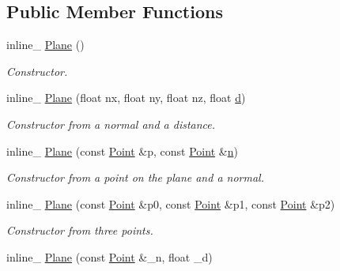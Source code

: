 \subsection*{Public Member Functions}
\begin{DoxyCompactItemize}
\item 
inline\+\_\+ \hyperlink{classPlane_abcc405319cab7568a33e6e1df69f144b}{Plane} ()\hypertarget{classPlane_abcc405319cab7568a33e6e1df69f144b}{}\label{classPlane_abcc405319cab7568a33e6e1df69f144b}

\begin{DoxyCompactList}\small\item\em Constructor. \end{DoxyCompactList}\item 
inline\+\_\+ \hyperlink{classPlane_a017c62e05e26489aa7ffd72212f41a57}{Plane} (float nx, float ny, float nz, float \hyperlink{classPlane_a61fc789fce8fbe72914f5397f1bbed44}{d})\hypertarget{classPlane_a017c62e05e26489aa7ffd72212f41a57}{}\label{classPlane_a017c62e05e26489aa7ffd72212f41a57}

\begin{DoxyCompactList}\small\item\em Constructor from a normal and a distance. \end{DoxyCompactList}\item 
inline\+\_\+ \hyperlink{classPlane_a9190b680a24a52f01c23411087f8d7f4}{Plane} (const \hyperlink{classPoint}{Point} \&p, const \hyperlink{classPoint}{Point} \&\hyperlink{classPlane_af400cfb3367fc032b4223a587d605035}{n})\hypertarget{classPlane_a9190b680a24a52f01c23411087f8d7f4}{}\label{classPlane_a9190b680a24a52f01c23411087f8d7f4}

\begin{DoxyCompactList}\small\item\em Constructor from a point on the plane and a normal. \end{DoxyCompactList}\item 
inline\+\_\+ \hyperlink{classPlane_ae7fe972b936a126a3ed2d5e4da0fbca2}{Plane} (const \hyperlink{classPoint}{Point} \&p0, const \hyperlink{classPoint}{Point} \&p1, const \hyperlink{classPoint}{Point} \&p2)\hypertarget{classPlane_ae7fe972b936a126a3ed2d5e4da0fbca2}{}\label{classPlane_ae7fe972b936a126a3ed2d5e4da0fbca2}

\begin{DoxyCompactList}\small\item\em Constructor from three points. \end{DoxyCompactList}\item 
inline\+\_\+ \hyperlink{classPlane_a9fee52646102f41f9067b422ce6cec21}{Plane} (const \hyperlink{classPoint}{Point} \&\+\_\+n, float \+\_\+d)\hypertarget{classPlane_a9fee52646102f41f9067b422ce6cec21}{}\label{classPlane_a9fee52646102f41f9067b422ce6cec21}


\end{DoxyCompactItemize}

